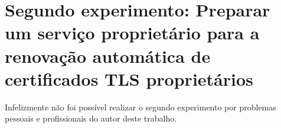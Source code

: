 \documentclass[
    openany,
    12pt,               %
    twoside,            %
    a4paper,            %
    english,            %
    brazil,             %
    ]{abntex2}
\begin{document}
\chapter{Segundo experimento: Preparar um serviço proprietário para a renovação automática de certificados TLS proprietários}
\label{cap:primeiro-experimento}

Infelizmente não foi possível realizar o segundo experimento por problemas pessoais e profissionais do autor deste trabalho. 

% 

\postextual

% 
\end{document}
